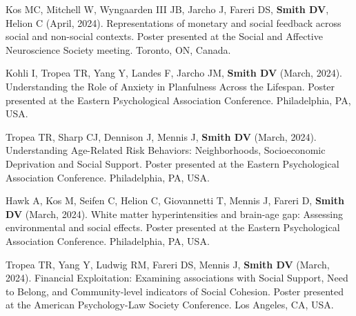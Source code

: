 \documentclass[11pt, letterpaper]{article}
\begin{document}
\begin{hangparas}{.5in}{1}
Kos MC, Mitchell W, Wyngaarden III JB, Jarcho J, Fareri DS, \textbf{Smith DV}, Helion C (April, 2024). Representations of monetary and social feedback across social and non-social contexts. Poster presented at the Social and Affective Neuroscience Society meeting. Toronto, ON, Canada.

Kohli I, Tropea TR, Yang Y, Landes F, Jarcho JM, \textbf{Smith DV} (March, 2024). Understanding the Role of Anxiety in Planfulness Across the Lifespan. Poster presented at the Eastern Psychological Association Conference. Philadelphia, PA, USA.

Tropea TR, Sharp CJ, Dennison J, Mennis J, \textbf{Smith DV} (March, 2024). Understanding Age-Related Risk Behaviors: Neighborhoods, Socioeconomic Deprivation and Social Support. Poster presented at the Eastern Psychological Association Conference. Philadelphia, PA, USA. 

Hawk A, Kos M, Seifen C, Helion C, Giovannetti T, Mennis J, Fareri D, \textbf{Smith DV} (March, 2024). White matter hyperintensities and brain-age gap: Assessing environmental and social effects. Poster presented at the Eastern Psychological Association Conference. Philadelphia, PA, USA.

Tropea TR, Yang Y, Ludwig RM, Fareri DS, Mennis J, \textbf{Smith DV} (March, 2024). Financial Exploitation: Examining associations with Social Support, Need to Belong, and Community-level indicators of Social Cohesion. Poster presented at the American Psychology-Law Society Conference. Los Angeles, CA, USA. \\

\end{hangparas}
\end{document}

